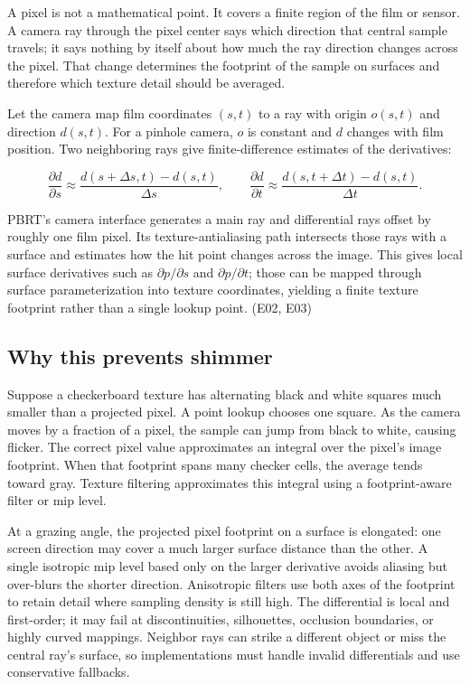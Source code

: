 A pixel is not a mathematical point. It covers a finite region of the film or sensor. A camera ray through the pixel center says which direction that central sample travels; it says nothing by itself about how much the ray direction changes across the pixel. That change determines the footprint of the sample on surfaces and therefore which texture detail should be averaged.

Let the camera map film coordinates \((s,t)\) to a ray with origin \(o(s,t)\) and direction \(d(s,t)\). For a pinhole camera, \(o\) is constant and \(d\) changes with film position. Two neighboring rays give finite-difference estimates of the derivatives:

\[
\frac{\partial d}{\partial s}\approx \frac{d(s+\Delta s,t)-d(s,t)}{\Delta s},\qquad
\frac{\partial d}{\partial t}\approx \frac{d(s,t+\Delta t)-d(s,t)}{\Delta t}.
\]

PBRT's camera interface generates a main ray and differential rays offset by roughly one film pixel. Its texture-antialiasing path intersects those rays with a surface and estimates how the hit point changes across the image. This gives local surface derivatives such as \(\partial p/\partial s\) and \(\partial p/\partial t\); those can be mapped through surface parameterization into texture coordinates, yielding a finite texture footprint rather than a single lookup point. (E02, E03)

\subsection{Why this prevents shimmer}\label{02-foundations-ii-ch036-why-this-prevents-shimmer}

Suppose a checkerboard texture has alternating black and white squares much smaller than a projected pixel. A point lookup chooses one square. As the camera moves by a fraction of a pixel, the sample can jump from black to white, causing flicker. The correct pixel value approximates an integral over the pixel's image footprint. When that footprint spans many checker cells, the average tends toward gray. Texture filtering approximates this integral using a footprint-aware filter or mip level.

At a grazing angle, the projected pixel footprint on a surface is elongated: one screen direction may cover a much larger surface distance than the other. A single isotropic mip level based only on the larger derivative avoids aliasing but over-blurs the shorter direction. Anisotropic filters use both axes of the footprint to retain detail where sampling density is still high. The differential is local and first-order; it may fail at discontinuities, silhouettes, occlusion boundaries, or highly curved mappings. Neighbor rays can strike a different object or miss the central ray's surface, so implementations must handle invalid differentials and use conservative fallbacks.

